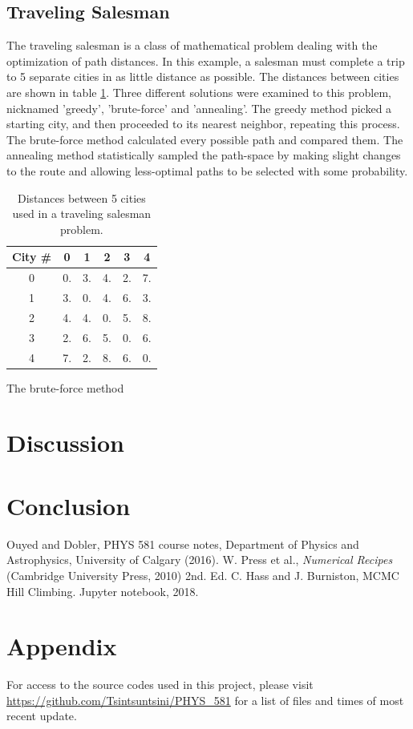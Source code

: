 \documentclass[twocolumn]{article}
\begin{document}
\subsection{Traveling Salesman}
The traveling salesman is a class of mathematical problem dealing with the optimization of path distances. In this example, a salesman must complete a trip to 5 separate cities in as little distance as possible. The distances between cities are shown in table \ref{tab:5cities}. Three different solutions were examined to this problem, nicknamed 'greedy', 'brute-force' and 'annealing'. The greedy method picked a starting city, and then proceeded to its nearest neighbor, repeating this process. The brute-force method calculated every possible path and compared them. The annealing method statistically sampled the path-space by making slight changes to the route and allowing less-optimal paths to be selected with some probability.
\begin{table}
\begin{center}
	\begin{tabular}{|c|c|c|c|c|c|}
		\hline
		City # & 0 & 1 & 2 & 3 & 4 \\
		\hline
		0 & 0. & 3. & 4. & 2. & 7. \\
		\hline
		1 & 3. & 0. & 4. & 6. & 3. \\
		\hline
		2 & 4. & 4. & 0. & 5. & 8. \\
		\hline
		3 & 2. & 6. & 5. & 0. & 6. \\
		\hline
		4 & 7. & 2. & 8. & 6. & 0. \\
		\hline
	\end{tabular}
	\caption{Distances between 5 cities used in a traveling salesman problem.}
	\label{tab:5cities}
\end{center}
\end{table}

The brute-force method
\section{Discussion}

 
\section{Conclusion}



\begin{thebibliography}{00}
	Ouyed and Dobler, PHYS 581 course notes, Department of Physics and Astrophysics, University of Calgary (2016).
	W. Press et al., \emph{Numerical Recipes} (Cambridge University Press, 2010) 2nd. Ed.
	C. Hass and J. Burniston, MCMC Hill Climbing. Jupyter notebook, 2018.
\end{thebibliography}

\section{Appendix}
For access to the source codes used in this project, please visit \url{https://github.com/Tsintsuntsini/PHYS_581} for a list of files and times of most recent update.
	
\end{document}
